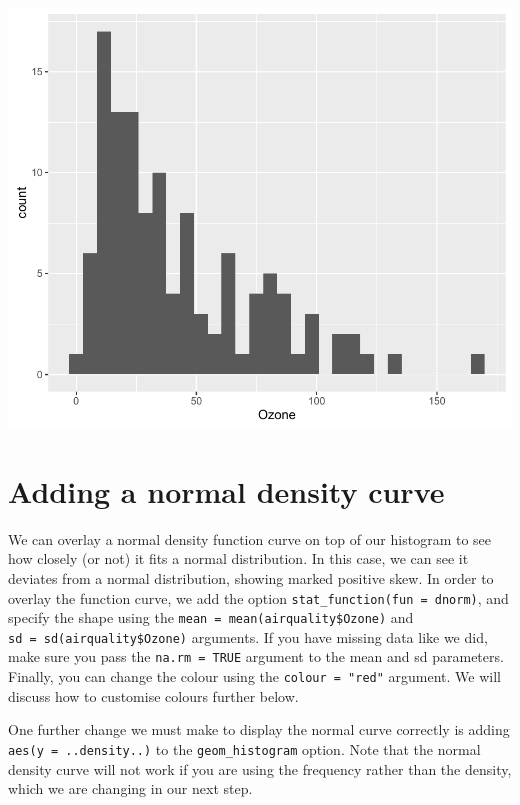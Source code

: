 \begin{center}\includegraphics[width=0.6\linewidth]{7_Histograms_pdf/histogram_1-1} \end{center}

\section{Adding a normal density
curve}\label{adding-a-normal-density-curve}

We can overlay a normal density function curve on top of our histogram
to see how closely (or not) it fits a normal distribution. In this case,
we can see it deviates from a normal distribution, showing marked
positive skew. In order to overlay the function curve, we add the option
\texttt{stat\_function(fun\ =\ dnorm)}, and specify the shape using the
\texttt{mean\ =\ mean(airquality\$Ozone)} and
\texttt{sd\ =\ sd(airquality\$Ozone)} arguments. If you have missing
data like we did, make sure you pass the \texttt{na.rm\ =\ TRUE}
argument to the mean and sd parameters. Finally, you can change the
colour using the \texttt{colour\ =\ "red"} argument. We will discuss how
to customise colours further below.

One further change we must make to display the normal curve correctly is
adding \texttt{aes(y\ =\ ..density..)} to the \texttt{geom\_histogram}
option. Note that the normal density curve will not work if you are
using the frequency rather than the density, which we are changing in
our next step.

\begin{Shaded}
\begin{Highlighting}[]
\StringTok{ }\NormalTok{(} \StringTok{ }
\StringTok{  }\NormalTok{(}\NormalTok{(} 
\StringTok{  }\NormalTok{(}  \NormalTok{, }
     \NormalTok{(}  \NormalTok{), }
      \NormalTok{)))}
\end{Highlighting}
\end{Shaded}

